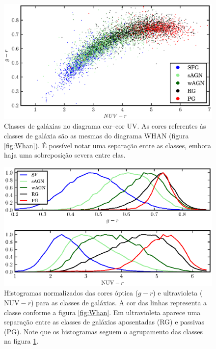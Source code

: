 \begin{figure}
	\includegraphics{figuras/uvcolor-color-class.eps}
	\caption[Diagrama cor--cor UV de acordo com o tipo de galáxia.]
	{Classes de galáxias no diagrama cor--cor UV. As cores referentes às classes de
	galáxia são as mesmas do diagrama WHAN (figura \ref{fig:Whan}). É possível
	notar uma separação entre as classes, embora haja uma sobreposição severa
	entre elas.}
	\label{fig:ColorClass}
\end{figure}

\begin{figure}
	\includegraphics{figuras/histo_galtype_color.eps}
	\caption[Histogramas de cores para as classes de galáxias.]
	{Histogramas normalizados das cores óptica ($g-r$) e ultravioleta
	($\mathrm{NUV}-r$) para as classes de galáxias. A cor das linhas representa a
	classe conforme a figura \ref{fig:Whan}. Em ultravioleta aparece uma separação
	entre as classes de galáxias aposentadas (RG) e passivas (PG). Note que os
	histogramas seguem o agrupamento das classes na figura
	\ref{fig:ColorClass}.}
	\label{fig:HistogramaCorClasse}
\end{figure}


